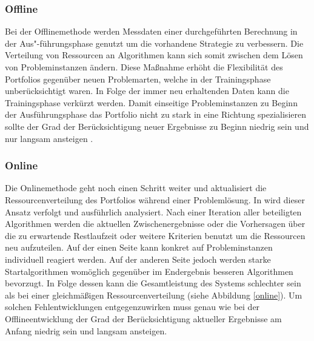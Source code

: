 \subsubsection*{Offline}

Bei der Offlinemethode werden Messdaten einer durchgeführten Berechnung in der Aus"-führungsphase genutzt um die vorhandene Strategie zu verbessern. Die Verteilung von Ressourcen an Algorithmen kann sich somit zwischen dem Lösen von Probleminstanzen ändern. Diese Maßnahme erhöht die Flexibilität des Portfolios gegenüber neuen Problemarten, welche in der Trainingsphase unberücksichtigt waren. In Folge der immer neu erhaltenden Daten kann die Trainingsphase verkürzt werden. Damit einseitige Probleminstanzen zu Beginn der Ausführungsphase das Portfolio nicht zu stark in eine Richtung spezialisieren sollte der Grad der Berücksichtigung neuer Ergebnisse zu Beginn niedrig sein und nur langsam ansteigen \cite{gaglioloschmidhuber06}.

\subsubsection*{Online}

Die Onlinemethode geht noch einen Schritt weiter und aktualisiert die Ressourcenverteilung des Portfolios während einer Problemlösung. In \cite{gaglioloschmidhuber06} wird dieser Ansatz verfolgt und ausführlich analysiert. Nach einer Iteration aller beteiligten Algorithmen werden die aktuellen Zwischenergebnisse oder die Vorhersagen über die zu erwartende Restlaufzeit oder weitere Kriterien benutzt um die Ressourcen neu aufzuteilen. Auf der einen Seite kann konkret auf Probleminstanzen individuell reagiert werden. Auf der anderen Seite jedoch werden starke Startalgorithmen womöglich gegenüber im Endergebnis besseren Algorithmen bevorzugt. In Folge dessen kann die Gesamtleistung des Systems schlechter sein als bei einer gleichmäßigen Ressourcenverteilung (siehe Abbildung \ref{online}). Um solchen Fehlentwicklungen entgegenzuwirken muss genau wie bei der Offlineentwicklung der Grad der Berücksichtigung aktueller Ergebnisse am Anfang niedrig sein und langsam ansteigen. \\



